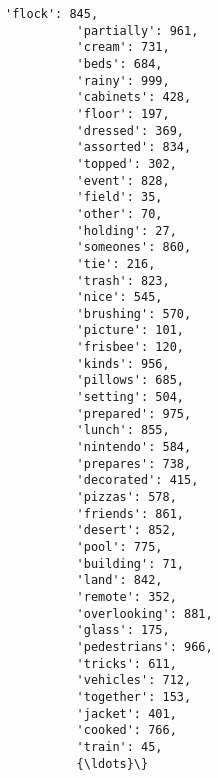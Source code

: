 \documentclass[11pt]{article}
\begin{document}
\begin{Verbatim}[commandchars=\\\{\}]
          'flock': 845,
          'partially': 961,
          'cream': 731,
          'beds': 684,
          'rainy': 999,
          'cabinets': 428,
          'floor': 197,
          'dressed': 369,
          'assorted': 834,
          'topped': 302,
          'event': 828,
          'field': 35,
          'other': 70,
          'holding': 27,
          'someones': 860,
          'tie': 216,
          'trash': 823,
          'nice': 545,
          'brushing': 570,
          'picture': 101,
          'frisbee': 120,
          'kinds': 956,
          'pillows': 685,
          'setting': 504,
          'prepared': 975,
          'lunch': 855,
          'nintendo': 584,
          'prepares': 738,
          'decorated': 415,
          'pizzas': 578,
          'friends': 861,
          'desert': 852,
          'pool': 775,
          'building': 71,
          'land': 842,
          'remote': 352,
          'overlooking': 881,
          'glass': 175,
          'pedestrians': 966,
          'tricks': 611,
          'vehicles': 712,
          'together': 153,
          'jacket': 401,
          'cooked': 766,
          'train': 45,
          {\ldots}\}
\end{Verbatim}
            

    
    
    
    
\end{document}
